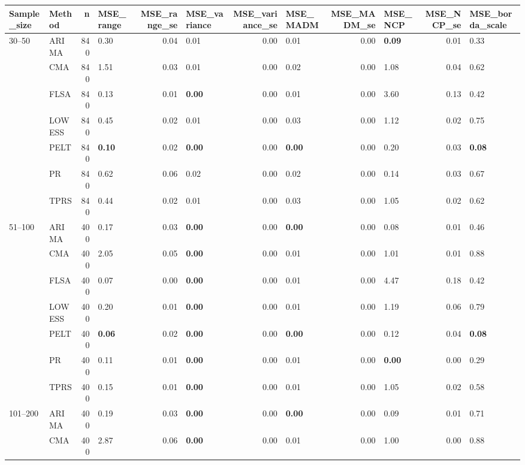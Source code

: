 \begin{table}[ht]
\centering
\begin{tabular}{llrlrlrlrlrl}
  \toprule
Sample_size & Method & n & MSE_range & MSE_range_se & MSE_variance & MSE_variance_se & MSE_MADM & MSE_MADM_se & MSE_NCP & MSE_NCP_se & MSE_borda_scale \\ 
  \midrule
30–50 & ARIMA & 840 & 0.30 & 0.04 & 0.01 & 0.00 & 0.01 & 0.00 & \textbf{0.09} & 0.01 & 0.33 \\ 
   & CMA & 840 & 1.51 & 0.03 & 0.01 & 0.00 & 0.02 & 0.00 & 1.08 & 0.04 & 0.62 \\ 
   & FLSA & 840 & 0.13 & 0.01 & \textbf{0.00} & 0.00 & 0.01 & 0.00 & 3.60 & 0.13 & 0.42 \\ 
   & LOWESS & 840 & 0.45 & 0.02 & 0.01 & 0.00 & 0.03 & 0.00 & 1.12 & 0.02 & 0.75 \\ 
   & PELT & 840 & \textbf{0.10} & 0.02 & \textbf{0.00} & 0.00 & \textbf{0.00} & 0.00 & 0.20 & 0.03 & \textbf{0.08} \\ 
   & PR & 840 & 0.62 & 0.06 & 0.02 & 0.00 & 0.02 & 0.00 & 0.14 & 0.03 & 0.67 \\ 
   & TPRS & 840 & 0.44 & 0.02 & 0.01 & 0.00 & 0.03 & 0.00 & 1.05 & 0.02 & 0.62 \\ 
  51–100 & ARIMA & 400 & 0.17 & 0.03 & \textbf{0.00} & 0.00 & \textbf{0.00} & 0.00 & 0.08 & 0.01 & 0.46 \\ 
   & CMA & 400 & 2.05 & 0.05 & \textbf{0.00} & 0.00 & 0.01 & 0.00 & 1.01 & 0.01 & 0.88 \\ 
   & FLSA & 400 & 0.07 & 0.00 & \textbf{0.00} & 0.00 & 0.01 & 0.00 & 4.47 & 0.18 & 0.42 \\ 
   & LOWESS & 400 & 0.20 & 0.01 & \textbf{0.00} & 0.00 & 0.01 & 0.00 & 1.19 & 0.06 & 0.79 \\ 
   & PELT & 400 & \textbf{0.06} & 0.02 & \textbf{0.00} & 0.00 & \textbf{0.00} & 0.00 & 0.12 & 0.04 & \textbf{0.08} \\ 
   & PR & 400 & 0.11 & 0.01 & \textbf{0.00} & 0.00 & 0.01 & 0.00 & \textbf{0.00} & 0.00 & 0.29 \\ 
   & TPRS & 400 & 0.15 & 0.01 & \textbf{0.00} & 0.00 & 0.01 & 0.00 & 1.05 & 0.02 & 0.58 \\ 
  101–200 & ARIMA & 400 & 0.19 & 0.03 & \textbf{0.00} & 0.00 & \textbf{0.00} & 0.00 & 0.09 & 0.01 & 0.71 \\ 
   & CMA & 400 & 2.87 & 0.06 & \textbf{0.00} & 0.00 & 0.01 & 0.00 & 1.00 & 0.00 & 0.88 \\ 

\end{tabular}
\end{table}
